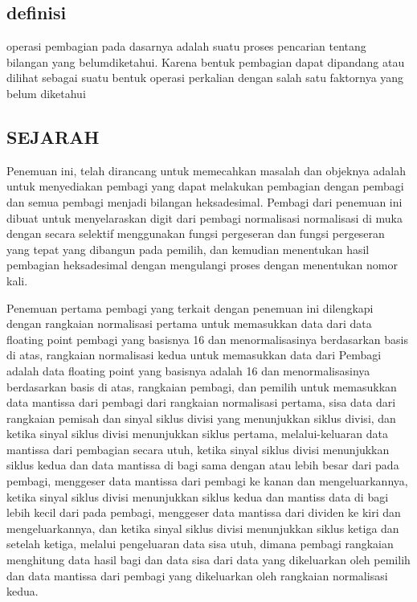 \subsection{definisi}
operasi pembagian pada dasarnya adalah 
suatu proses pencarian tentang bilangan yang belumdiketahui. Karena bentuk pembagian dapat dipandang atau dilihat sebagai suatu bentuk operasi perkalian dengan salah satu faktornya yang belum diketahui

\subsection{SEJARAH}
Penemuan ini,  telah dirancang untuk memecahkan masalah dan objeknya adalah untuk menyediakan pembagi yang dapat melakukan pembagian dengan pembagi 
dan semua pembagi menjadi bilangan heksadesimal. Pembagi dari penemuan ini dibuat untuk menyelaraskan digit dari pembagi normalisasi normalisasi di muka 
dengan secara selektif menggunakan fungsi pergeseran dan fungsi pergeseran yang tepat yang dibangun pada pemilih, 
dan kemudian menentukan hasil pembagian heksadesimal dengan mengulangi proses dengan menentukan nomor kali.

Penemuan pertama pembagi yang terkait dengan penemuan ini dilengkapi dengan rangkaian normalisasi pertama untuk memasukkan data dari data floating point pembagi yang basisnya 16 dan menormalisasinya berdasarkan basis di atas, 
rangkaian normalisasi kedua untuk memasukkan data dari Pembagi adalah data floating point yang basisnya adalah 16 dan menormalisasinya berdasarkan basis di atas, rangkaian pembagi, 
dan pemilih untuk memasukkan data mantissa dari pembagi dari rangkaian normalisasi pertama, 
sisa data dari rangkaian pemisah dan sinyal siklus divisi yang menunjukkan siklus divisi, dan ketika sinyal siklus divisi menunjukkan siklus pertama,
melalui-keluaran data mantissa dari pembagian secara utuh, ketika sinyal siklus divisi menunjukkan siklus kedua dan data mantissa di bagi sama dengan atau lebih besar dari pada pembagi, 
menggeser data mantissa dari pembagi ke kanan dan mengeluarkannya, 
ketika sinyal siklus divisi menunjukkan siklus kedua dan mantiss data di bagi lebih kecil dari pada pembagi, 
menggeser data mantissa dari dividen ke kiri dan mengeluarkannya,
dan ketika sinyal siklus divisi menunjukkan siklus ketiga dan setelah ketiga, melalui pengeluaran data sisa utuh, 
dimana pembagi rangkaian menghitung data hasil bagi dan data sisa dari data yang dikeluarkan oleh pemilih dan data mantissa dari pembagi yang dikeluarkan oleh rangkaian normalisasi kedua.

